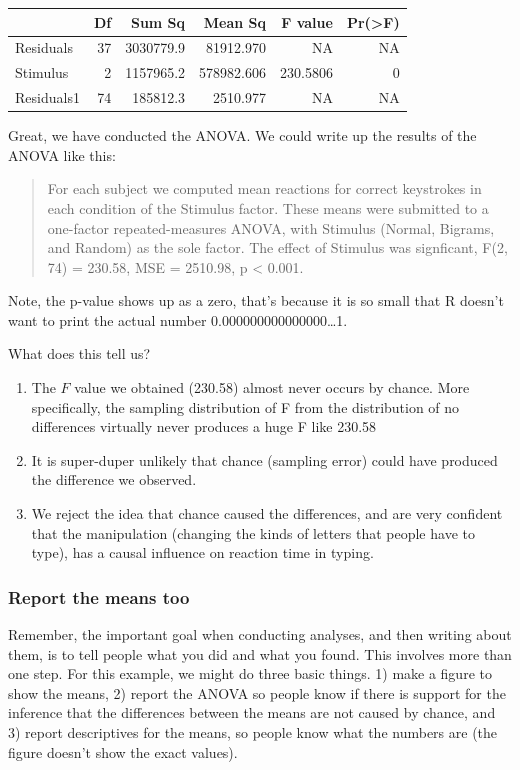 \documentclass[
]{book}
\begin{document}
\begin{tabular}{l|r|r|r|r|r}
\hline
  & Df & Sum Sq & Mean Sq & F value & Pr(>F)\\
\hline
Residuals & 37 & 3030779.9 & 81912.970 & NA & NA\\
\hline
Stimulus & 2 & 1157965.2 & 578982.606 & 230.5806 & 0\\
\hline
Residuals1 & 74 & 185812.3 & 2510.977 & NA & NA\\
\hline
\end{tabular}

Great, we have conducted the ANOVA. We could write up the results of the ANOVA like this:

\begin{quote}
For each subject we computed mean reactions for correct keystrokes in each condition of the Stimulus factor. These means were submitted to a one-factor repeated-measures ANOVA, with Stimulus (Normal, Bigrams, and Random) as the sole factor. The effect of Stimulus was signficant, F(2, 74) = 230.58, MSE = 2510.98, p \textless{} 0.001.
\end{quote}

Note, the p-value shows up as a zero, that's because it is so small that R doesn't want to print the actual number 0.000000000000000\ldots1.

What does this tell us?

\begin{enumerate}
\def\labelenumi{\arabic{enumi}.}
\item
  The \(F\) value we obtained (230.58) almost never occurs by chance. More specifically, the sampling distribution of F from the distribution of no differences virtually never produces a huge F like 230.58
\item
  It is super-duper unlikely that chance (sampling error) could have produced the difference we observed.
\item
  We reject the idea that chance caused the differences, and are very confident that the manipulation (changing the kinds of letters that people have to type), has a causal influence on reaction time in typing.
\end{enumerate}

\hypertarget{report-the-means-too}{%
\subsubsection{Report the means too}\label{report-the-means-too}}

Remember, the important goal when conducting analyses, and then writing about them, is to tell people what you did and what you found. This involves more than one step. For this example, we might do three basic things. 1) make a figure to show the means, 2) report the ANOVA so people know if there is support for the inference that the differences between the means are not caused by chance, and 3) report descriptives for the means, so people know what the numbers are (the figure doesn't show the exact values).
\end{document}
